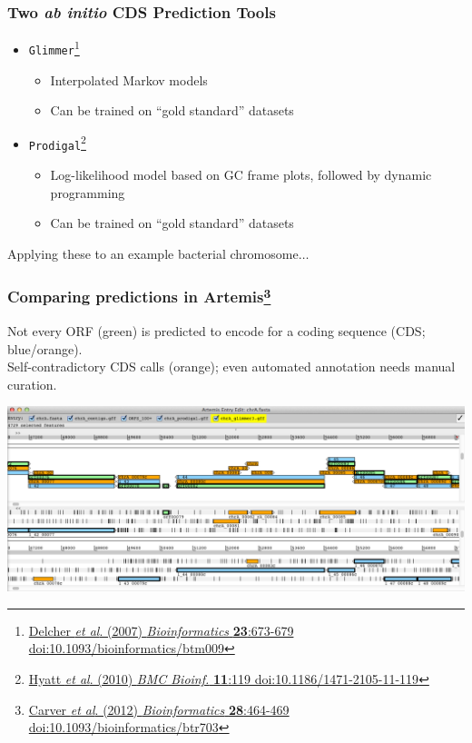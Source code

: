 \begin{frame}
  \frametitle{Two \textit{ab initio} CDS Prediction Tools}
  \begin{itemize}
    \item \texttt{Glimmer}\footnote{\tiny{\href{http://dx.doi.org/10.1093/bioinformatics/btm009}{Delcher \textit{et al}. (2007) \textit{Bioinformatics} \textbf{23}:673-679 doi:10.1093/bioinformatics/btm009}}}
    \begin{itemize}
      \item Interpolated Markov models
      \item Can be trained on ``gold standard'' datasets
    \end{itemize}
    \item \texttt{Prodigal}\footnote{\tiny{\href{http://dx.doi.org/10.1186/1471-2105-11-119}{Hyatt \textit{et al}. (2010) \textit{BMC Bioinf.} \textbf{11}:119 doi:10.1186/1471-2105-11-119}}}
    \begin{itemize}
      \item Log-likelihood model based on GC frame plots, followed by dynamic programming
      \item Can be trained on ``gold standard'' datasets
    \end{itemize}
  \end{itemize}
  Applying these to an example bacterial chromosome$\ldots$
\end{frame}

\begin{frame}
  \frametitle{Comparing predictions in Artemis\footnote{\tiny{\href{http://dx.doi.org/10.1093/bioinformatics/btr703}{Carver \textit{et al}. (2012) \textit{Bioinformatics} \textbf{28}:464-469 doi:10.1093/bioinformatics/btr703}}}}
  Not every ORF (green) is predicted to encode for a coding sequence (CDS; blue/orange).\\
  Self-contradictory CDS calls (orange); even automated annotation needs manual curation.
  \begin{center}
    \includegraphics[width=1\textwidth]{images/artemis_cdspred3}     
  \end{center}
\end{frame}

